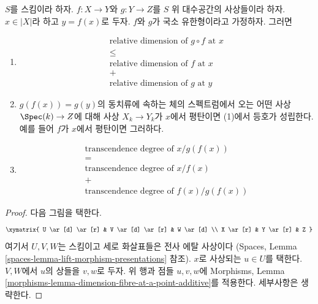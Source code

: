 \begin{lemma}
\label{lemma-dimension-fibre-at-a-point-additive}
$S$를 스킴이라 하자. $f : X \to Y$와 $g : Y \to Z$를
$S$ 위 대수공간의 사상들이라 하자. $x \in |X|$라 하고
$y = f(x)$로 두자. $f$와 $g$가 국소 유한형이라고 가정하자. 그러면
\begin{enumerate}
\item
$$
\begin{matrix}
\text{relative dimension of }g \circ f\text{ at }x \\
\leq \\
\text{relative dimension of }f\text{ at }x \\
+ \\
\text{relative dimension of }g\text{ at }y
\end{matrix}
$$
\item $g(f(x)) = g(y)$의 동치류에 속하는 체의 스펙트럼에서 오는
어떤 사상 $\Spec(k) \to Z$에 대해 사상 $X_k \to Y_k$가
$x$에서 평탄이면 (1)에서 등호가 성립한다. 예를 들어 $f$가
$x$에서 평탄이면 그러하다.
\item
$$
\begin{matrix}
\text{transcendence degree of }x/g(f(x)) \\
= \\
\text{transcendence degree of }x/f(x) \\
+ \\
\text{transcendence degree of }f(x)/g(f(x))
\end{matrix}
$$
\end{enumerate}
\end{lemma}

\begin{proof}
다음 그림을 택한다.
$$
\xymatrix{
U \ar[d] \ar[r] & V \ar[d] \ar[r] & W \ar[d] \\
X \ar[r] & Y \ar[r] & Z
}
$$
여기서 $U, V, W$는 스킴이고 세로 화살표들은 전사 에탈 사상이다
(Spaces, Lemma \ref{spaces-lemma-lift-morphism-presentations} 참조).
$x$로 사상되는 $u \in U$를 택한다. $V, W$에서 $u$의 상들을
$v, w$로 두자. 위 행과 점들 $u, v, w$에 Morphisms, Lemma
\ref{morphisms-lemma-dimension-fibre-at-a-point-additive}를 적용한다.
세부사항은 생략한다.
\end{proof}

